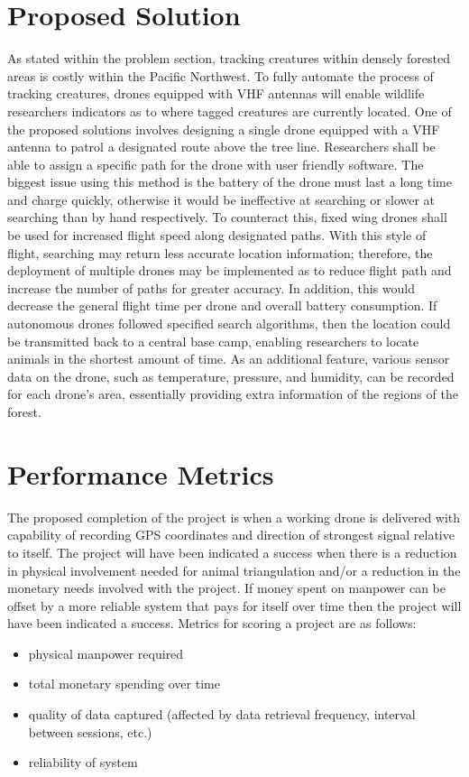 \documentclass[onecolumn, draftclsnofoot,10pt, compsoc]{IEEEtran}
\begin{document}
\section{Proposed Solution}
As stated within the problem section, tracking creatures within densely forested areas is costly within the Pacific Northwest. To fully automate the process of tracking creatures, drones equipped with VHF antennas will enable wildlife researchers indicators as to where tagged creatures are currently located. One of the proposed solutions involves designing a single drone equipped with a VHF antenna to patrol a designated route above the tree line. Researchers shall be able to assign a specific path for the drone with user friendly software. The biggest issue using this method is the battery of the drone must last a long time and charge quickly, otherwise it would be ineffective at searching or slower at searching than by hand respectively. To counteract this, fixed wing drones shall be used for increased flight speed along designated paths. With this style of flight, searching may return less accurate location information; therefore, the deployment of multiple drones may be implemented as to reduce flight path and increase the number of paths for greater accuracy. In addition, this would decrease the general flight time per drone and overall battery consumption. If autonomous drones followed specified search algorithms, then the location could be transmitted back to a central base camp, enabling researchers to locate animals in the shortest amount of time. As an additional feature, various sensor data on the drone, such as temperature, pressure, and humidity, can be recorded for each drone's area, essentially providing extra information of the regions of the forest.

\section{Performance Metrics}
The proposed completion of the project is when a working drone is delivered with capability of recording GPS coordinates and direction of strongest signal relative to itself. The project will have been indicated a success when there is a reduction in physical involvement needed for animal triangulation and/or a reduction in the monetary needs involved with the project. If money spent on manpower can be offset by a more reliable system that pays for itself over time then the project will have been indicated a success. Metrics for scoring a project are as follows:
\begin{itemize}
    \item physical manpower required
    \item total monetary spending over time
    \item quality of data captured (affected by data retrieval frequency, interval between sessions, etc.)
    \item reliability of system
\end{itemize}
\end{document}
